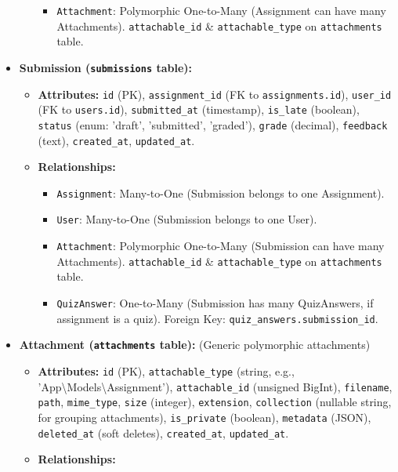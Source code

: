 \documentclass[12pt,a4paper]{article}
\begin{document}
\begin{itemize}
\begin{itemize}
\begin{itemize}
            \item \texttt{Attachment}: Polymorphic One-to-Many (Assignment can have many Attachments). \texttt{attachable\_id} \& \texttt{attachable\_type} on \texttt{attachments} table.
        \end{itemize}
    \end{itemize}
    \item \textbf{Submission (\texttt{submissions} table):}
    \begin{itemize}
        \item \textbf{Attributes:} \texttt{id} (PK), \texttt{assignment\_id} (FK to \texttt{assignments.id}), \texttt{user\_id} (FK to \texttt{users.id}), \texttt{submitted\_at} (timestamp), \texttt{is\_late} (boolean), \texttt{status} (enum: 'draft', 'submitted', 'graded'), \texttt{grade} (decimal), \texttt{feedback} (text), \texttt{created\_at}, \texttt{updated\_at}.
        \item \textbf{Relationships:}
        \begin{itemize}
            \item \texttt{Assignment}: Many-to-One (Submission belongs to one Assignment).
            \item \texttt{User}: Many-to-One (Submission belongs to one User).
            \item \texttt{Attachment}: Polymorphic One-to-Many (Submission can have many Attachments). \texttt{attachable\_id} \& \texttt{attachable\_type} on \texttt{attachments} table.
            \item \texttt{QuizAnswer}: One-to-Many (Submission has many QuizAnswers, if assignment is a quiz). Foreign Key: \texttt{quiz\_answers.submission\_id}.
        \end{itemize}
    \end{itemize}
    \item \textbf{Attachment (\texttt{attachments} table):} (Generic polymorphic attachments)
    \begin{itemize}
        \item \textbf{Attributes:} \texttt{id} (PK), \texttt{attachable\_type} (string, e.g., 'App\textbackslash{}Models\textbackslash{}Assignment'), \texttt{attachable\_id} (unsigned BigInt), \texttt{filename}, \texttt{path}, \texttt{mime\_type}, \texttt{size} (integer), \texttt{extension}, \texttt{collection} (nullable string, for grouping attachments), \texttt{is\_private} (boolean), \texttt{metadata} (JSON), \texttt{deleted\_at} (soft deletes), \texttt{created\_at}, \texttt{updated\_at}.
        \item \textbf{Relationships:}

\end{itemize}
\end{itemize}
\end{document}
